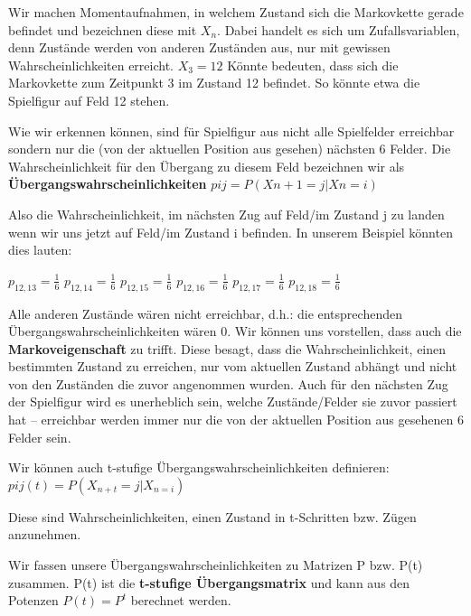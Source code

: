 {
Wir machen Momentaufnahmen, in welchem Zustand sich die Markovkette
gerade befindet und bezeichnen diese mit  $X_{n}$. Dabei handelt es
sich um Zufallsvariablen, denn Zust\"ande werden von anderen
Zust\"anden aus, nur mit gewissen Wahrscheinlichkeiten erreicht. 
$X_{3}=12$ K\"onnte bedeuten, dass sich die Markovkette zum Zeitpunkt 3
im Zustand 12 befindet. So k\"onnte etwa die Spielfigur auf Feld 12
stehen.}

{
Wie wir erkennen k\"onnen, sind f\"ur Spielfigur aus nicht alle
Spielfelder erreichbar sondern nur die (von der aktuellen Position aus
gesehen) n\"achsten 6 Felder. Die Wahrscheinlichkeit f\"ur den
\"Ubergang zu diesem Feld bezeichnen wir als
 \textbf{\"Ubergangswahrscheinlichkeiten}
$\mathit{pij}=P(\mathit{Xn}+1=j|\mathit{Xn}=i)$}

{
Also die Wahrscheinlichkeit, im n\"achsten Zug auf Feld/im Zustand j zu
landen wenn wir uns jetzt auf Feld/im Zustand i befinden. In unserem
Beispiel k\"onnten dies lauten:}

 $p_{12,13}=\frac{1}{6}$  $p_{12,14}=\frac{1}{6}$ 
$p_{12,15}=\frac{1}{6}$  $p_{12,16}=\frac{1}{6}$ 
$p_{12,17}=\frac{1}{6}$  $p_{12,18}=\frac{1}{6}$ 


\bigskip

{
Alle anderen Zust\"ande w\"aren nicht erreichbar, d.h.: die
entsprechenden \"Ubergangswahrscheinlichkeiten w\"aren 0. Wir k\"onnen
uns vorstellen, dass auch die \textbf{Markoveigenschaft} zu trifft. Diese besagt,
dass die Wahrscheinlichkeit, einen bestimmten Zustand zu erreichen, nur
vom aktuellen Zustand abh\"angt und nicht von den Zust\"anden die zuvor
angenommen wurden. Auch f\"ur den n\"achsten Zug der Spielfigur wird es
unerheblich sein, welche Zust\"ande/Felder sie zuvor passiert hat --
erreichbar werden immer nur die von der aktuellen Position aus
gesehenen 6 Felder sein.}


\bigskip

{
Wir k\"onnen auch t-stufige Übergangswahrscheinlichkeiten definieren: 
$\mathit{pij}(t)=P(X_{n+t}=j|X_{n=i})$ }

{
Diese sind Wahrscheinlichkeiten, einen Zustand in t-Schritten bzw.
Z\"ugen anzunehmen. }

Wir fassen unsere \"Ubergangswahrscheinlichkeiten zu Matrizen P bzw.
P(t) zusammen. P(t) ist die \textbf{t-stufige \"Ubergangsmatrix} und kann aus
den Potenzen  $P(t)=P^{t}$ berechnet werden.


